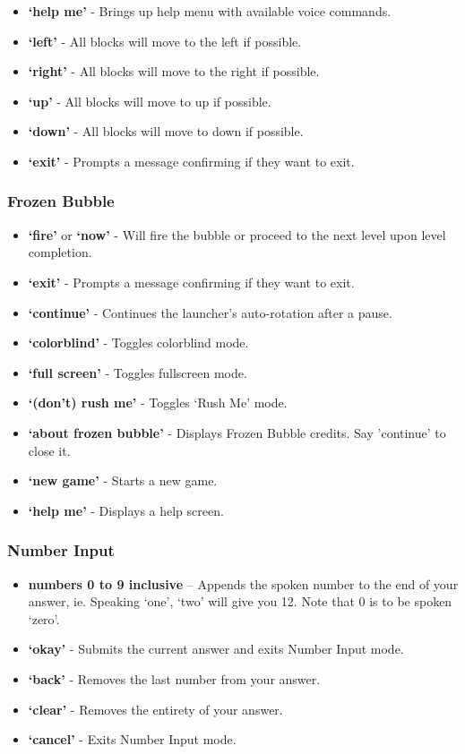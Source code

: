 \documentclass[11pt, oneside]{article}
\begin{document}
\begin{itemize}
  	\item {\bf`help me'} - Brings up help menu with available voice commands. 
	\item {\bf`left'} - All blocks will move to the left if possible. 
	\item {\bf`right'} - All blocks will move to the right if possible.
	\item {\bf`up'} - All blocks will move to up if possible. 
	\item {\bf`down'} - All blocks will move to down if possible.
	\item {\bf`exit'} - Prompts a message confirming if they want to exit.
	
\end{itemize}

\subsubsection{Frozen Bubble}

\begin{itemize}
	\item {\bf`fire'} or {\bf`now'} - Will fire the bubble or proceed to the next
	level upon level completion.
	\item {\bf`exit'} - Prompts a message confirming if they want to exit.
	\item {\bf`continue'} - Continues the launcher's auto-rotation after a pause.
	\item {\bf`colorblind'} - Toggles colorblind mode.
	\item {\bf`full screen'} - Toggles fullscreen mode.
	\item {\bf`(don't) rush me'} - Toggles `Rush Me' mode.
	\item {\bf`about frozen bubble'} - Displays Frozen Bubble credits. Say 'continue'
	to close it.
	\item {\bf`new game'} - Starts a new game.
	\item {\bf`help me'} - Displays a help screen.
	
\end{itemize}

\subsubsection{Number Input}
\begin{itemize}
  \item {\bf numbers 0 to 9 inclusive} – Appends the spoken number
    to the end of your answer, ie. Speaking `one', `two' will give you
    12. Note that 0 is to be spoken `zero'.
  \item {\bf `okay'} - Submits the current answer and exits Number
    Input mode.
  \item {\bf `back'} - Removes the last number from your answer.
  \item {\bf `clear'} - Removes the entirety of your answer.
  \item {\bf `cancel'} - Exits Number Input mode.
\end{itemize}
\end{document}
